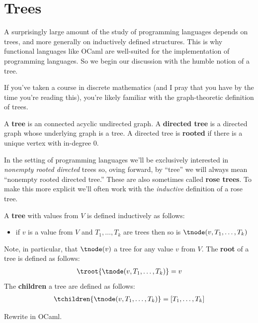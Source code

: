 \section{Trees}

A surprisingly large amount of the study of programming languages depends on trees, and more generally on inductively defined structures.
This is why functional languages like OCaml are well-suited for the implementation of programming languages.
So we begin our discussion with the humble notion of a tree.

If you've taken a course in discrete mathematics (and I pray that you have by the time you're reading this), you're likely familiar with the graph-theoretic definition of trees.

\begin{definition}
  A \textbf{tree} is an connected acyclic undirected graph.
  A \textbf{directed tree} is a directed graph whose underlying graph is a tree.
  A directed tree is \textbf{rooted} if there is a unique vertex with in-degree 0.
\end{definition}
%
In the setting of programming languages we'll be exclusively interested in \textit{nonempty rooted directed} trees so, oving forward, by \enquote{tree} we will always mean \enquote{nonempty rooted directed tree.}
These are also sometimes called \textbf{rose trees}.
To make this more explicit we'll often work with the \textit{inductive} definition of a rose tree.

\begin{definition}
  \label{def:rose-tree}
  A \textbf{tree} with values from $V$ is defined inductively as follows:
  \begin{itemize}
  \item if $v$ is a value from $V$ and $T_1, \dots, T_k$ are trees then so is $\tnode(v, T_1, \dots, T_k)$
  \end{itemize}
  Note, in particular, that $\tnode(v)$ a tree for any value $v$ from $V$.
  The \textbf{root} of a tree is defined as follows:
  \begin{align*}
    \troot {\tnode(v, T_1, \dots, T_k)} = v
  \end{align*}
  The \textbf{children} a tree are defined as follows:
  \begin{align*}
    \tchildren{\tnode(v, T_1, \dots, T_k)} = [T_1, \dots, T_k]
  \end{align*}
\end{definition}

\begin{exercise}
  Rewrite  in OCaml.
\end{exercise}

